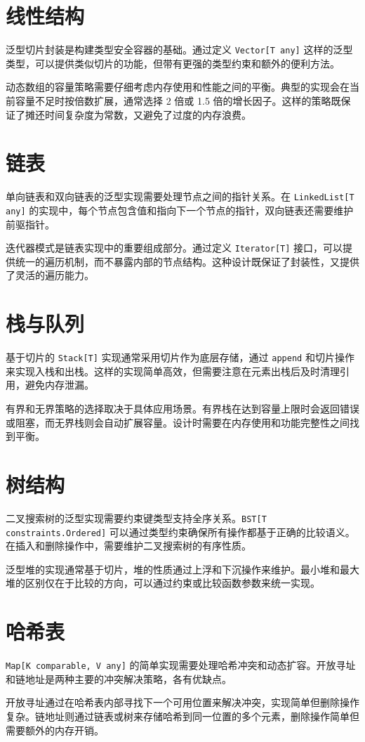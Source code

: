 \section{线性结构}
泛型切片封装是构建类型安全容器的基础。通过定义 \texttt{Vector[T any]} 这样的泛型类型，可以提供类似切片的功能，但带有更强的类型约束和额外的便利方法。\par
动态数组的容量策略需要仔细考虑内存使用和性能之间的平衡。典型的实现会在当前容量不足时按倍数扩展，通常选择 2 倍或 1.5 倍的增长因子。这样的策略既保证了摊还时间复杂度为常数，又避免了过度的内存浪费。\par
\section{链表}
单向链表和双向链表的泛型实现需要处理节点之间的指针关系。在 \texttt{LinkedList[T any]} 的实现中，每个节点包含值和指向下一个节点的指针，双向链表还需要维护前驱指针。\par
迭代器模式是链表实现中的重要组成部分。通过定义 \texttt{Iterator[T]} 接口，可以提供统一的遍历机制，而不暴露内部的节点结构。这种设计既保证了封装性，又提供了灵活的遍历能力。\par
\section{栈与队列}
基于切片的 \texttt{Stack[T]} 实现通常采用切片作为底层存储，通过 \texttt{append} 和切片操作来实现入栈和出栈。这样的实现简单高效，但需要注意在元素出栈后及时清理引用，避免内存泄漏。\par
有界和无界策略的选择取决于具体应用场景。有界栈在达到容量上限时会返回错误或阻塞，而无界栈则会自动扩展容量。设计时需要在内存使用和功能完整性之间找到平衡。\par
\section{树结构}
二叉搜索树的泛型实现需要约束键类型支持全序关系。\texttt{BST[T constraints.Ordered]} 可以通过类型约束确保所有操作都基于正确的比较语义。在插入和删除操作中，需要维护二叉搜索树的有序性质。\par
泛型堆的实现通常基于切片，堆的性质通过上浮和下沉操作来维护。最小堆和最大堆的区别仅在于比较的方向，可以通过约束或比较函数参数来统一实现。\par
\section{哈希表}
\texttt{Map[K comparable, V any]} 的简单实现需要处理哈希冲突和动态扩容。开放寻址和链地址是两种主要的冲突解决策略，各有优缺点。\par
开放寻址通过在哈希表内部寻找下一个可用位置来解决冲突，实现简单但删除操作复杂。链地址则通过链表或树来存储哈希到同一位置的多个元素，删除操作简单但需要额外的内存开销。\par
